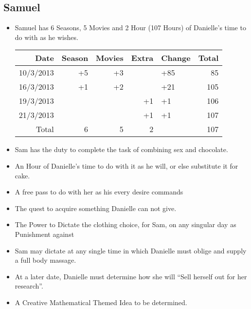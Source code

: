    \subsection{Samuel}
   \begin{itemize}
     \item Samuel has 6 Seasons, 5 Movies and 2 Hour (107 Hours) of Danielle's time to do with as he wishes.\\
     \begin{tabular}{r|rrr|l||r}
 		Date&Season&Movies&Extra&Change&Total\\
 		\hline
 		10/3/2013&+5&+3	&	&+85	&85 \\
 		16/3/2013&+1&+2	&	&+21	&105\\
 		19/3/2013&	&	&+1	&+1		&106\\
 		21/3/2013&	&	&+1	&+1		&107\\
 		\hline
 		\hline
 		Total&6&5&2&&107
 	\end{tabular}
     \item Sam has the duty to complete the task of combining sex and chocolate.
     \item An Hour of Danielle's time to do with it as he will, or else substitute it for cake.
     \item A free pass to do with her as his every desire commands
     \item The quest to acquire something Danielle can not give.
     \item The Power to Dictate the clothing choice, for Sam, on any singular day as Punishment against
     \item Sam may dictate at any single time in which Danielle must oblige and supply a full body massage.
     \item At a later date, Danielle must determine how she will ``Sell herself out for her research''.
     \item A Creative Mathematical Themed Idea to be determined.
   \end{itemize}
    